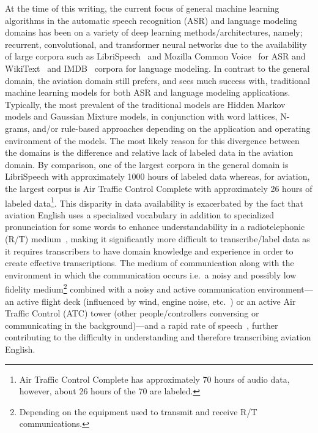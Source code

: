 \documentclass[12pt]{article}
\begin{document}
At the time of this writing, the current focus of general machine learning algorithms in the automatic speech recognition (ASR) and language modeling
domains has been on a variety of deep learning methods/architectures, namely; recurrent, convolutional, and transformer neural networks due to the
availability of large corpora such as LibriSpeech~\cite{panayotov_librispeech_2015} and Mozilla Common Voice~\cite{ardila_common_2020} for ASR and
WikiText~\cite{merity_pointer_2016} and IMDB~\cite{maas_learning_2011} corpora for language modeling. In contrast to the general domain, the aviation
domain still prefers, and sees much success with, traditional machine learning models for both ASR and language modeling applications. Typically, the
most prevalent of the traditional models are Hidden Markov models and Gaussian Mixture models, in conjunction with word lattices, N-grams, and/or
rule-based approaches depending on the application and operating environment of the models. The most likely reason for this divergence between the
domains is the difference and relative lack of labeled data in the aviation domain. By comparison, one of the largest corpora in the general domain is
LibriSpeech with approximately 1000 hours of labeled data whereas, for aviation, the largest corpus is Air Traffic Control Complete with approximately
26 hours of labeled data\footnote{Air Traffic Control Complete has approximately 70 hours of audio data, however, about 26 hours of the 70 are
    labeled.}. This disparity in data availability is exacerbated by the fact that aviation English uses a specialized vocabulary in addition to
specialized pronunciation for some words to enhance understandability in a radiotelephonic (R/T) medium~\cite{paltridge_handbook_2013}, making it
significantly more difficult to transcribe/label data as it requires transcribers to have domain knowledge and experience in order to create effective
transcriptions. The medium of communication along with the environment in which the communication occurs i.e.~a noisy and possibly low fidelity
medium\footnote{Depending on the equipment used to transmit and receive R/T communications.} combined with a noisy and active communication
environment---an active flight deck (influenced by wind, engine noise, etc.~) or an active Air Traffic Control (ATC) tower (other people/controllers
conversing or communicating in the background)---and a rapid rate of speech~\cite{paltridge_handbook_2013}, further contributing to the difficulty in
understanding and therefore transcribing aviation English.
\end{document}

